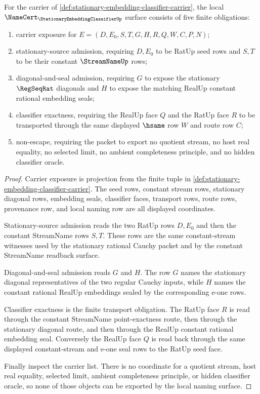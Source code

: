 \begin{theorem}
\label{thm:stationary-embedding-classifier-namecert-obligations}
For the carrier of \autoref{def:stationary-embedding-classifier-carrier}, the local $\NameCert_{\StationaryEmbeddingClassifierUp}$ surface consists of five finite obligations:
\begin{enumerate}
\item carrier exposure for $E=(D,E_0,S,T,G,H,R,Q,W,C,P,N)$;
\item stationary-source admission, requiring $D,E_0$ to be RatUp seed rows and $S,T$ to be their constant $\StreamNameUp$ rows;
\item diagonal-and-seal admission, requiring $G$ to expose the stationary $\RegSeqRat$ diagonals and $H$ to expose the matching RealUp constant rational embedding seals;
\item classifier exactness, requiring the RealUp face $Q$ and the RatUp face $R$ to be transported through the same displayed $\hsame$ row $W$ and route row $C$;
\item non-escape, requiring the packet to export no quotient stream, no host real equality, no selected limit, no ambient completeness principle, and no hidden classifier oracle.
\end{enumerate}
\end{theorem}
\begin{proof}
Carrier exposure is projection from the finite tuple in \autoref{def:stationary-embedding-classifier-carrier}. The seed rows, constant stream rows, stationary diagonal rows, embedding seals, classifier faces, transport rows, route rows, provenance row, and local naming row are all displayed coordinates.

Stationary-source admission reads the two RatUp rows $D,E_0$ and then the constant StreamName rows $S,T$. These rows are the same constant-stream witnesses used by the stationary rational Cauchy packet and by the constant StreamName readback surface.

Diagonal-and-seal admission reads $G$ and $H$. The row $G$ names the stationary diagonal representatives of the two regular Cauchy inputs, while $H$ names the constant rational RealUp embeddings sealed by the corresponding e-one rows.

Classifier exactness is the finite transport obligation. The RatUp face $R$ is read through the constant StreamName point-exactness route, then through the stationary diagonal route, and then through the RealUp constant rational embedding seal. Conversely the RealUp face $Q$ is read back through the same displayed constant-stream and e-one seal rows to the RatUp seed face.

Finally inspect the carrier list. There is no coordinate for a quotient stream, host real equality, selected limit, ambient completeness principle, or hidden classifier oracle, so none of those objects can be exported by the local naming surface.
\end{proof}

